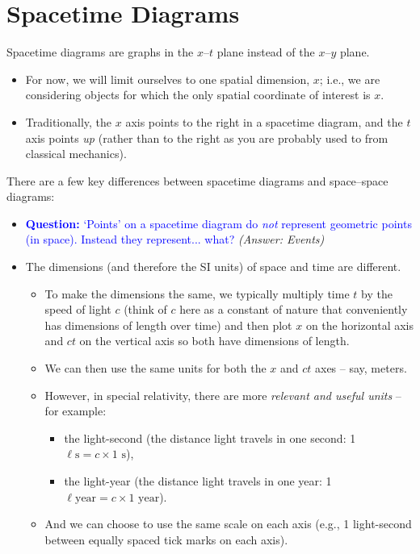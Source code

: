 \documentclass[11pt, letterpaper, openany]{book}
\begin{document}
\section{Spacetime Diagrams}

Spacetime diagrams are graphs in the $x$--$t$ plane instead of the $x$--$y$ plane.
\begin{itemize}
    \item For now, we will limit ourselves to one spatial dimension, $x$; i.e., we are considering objects for which the only spatial coordinate of interest is $x$.
    \item Traditionally, the $x$ axis points to the right in a spacetime diagram, and the $t$ axis points \textit{up} (rather than to the right as you are probably used to from classical mechanics).
\end{itemize}

\begin{center}
\end{center}

There are a few key differences between spacetime diagrams and space--space diagrams:

\begin{itemize}
    \item \textbf{\textcolor{blue}{Question:}} \textcolor{blue}{`Points' on a spacetime diagram do \textit{not} represent geometric points (in space). Instead they represent... what?} \textit{(Answer: Events)}
    \item The dimensions (and therefore the SI units) of space and time are different.
    \begin{itemize}
        \item To make the dimensions the same, we typically multiply time $t$ by the speed of light $c$ (think of $c$ here as a constant of nature that conveniently has dimensions of length over time) and then plot $x$ on the horizontal axis and $ct$ on the vertical axis so both have dimensions of length.
        \item We can then use the same units for both the $x$ and $ct$ axes -- say, meters.
        \item However, in special relativity, there are more \textit{relevant and useful units} -- for example:
        \begin{itemize}
            \item the light-second (the distance light travels in one second: 1 $\ell\text{s} = c \times 1\text{ s}$),
            \item the light-year (the distance light travels in one year: 1 $\ell\text{year} = c \times 1\text{ year}$).
        \end{itemize}
        \item And we can choose to use the same scale on each axis (e.g., 1 light-second between equally spaced tick marks on each axis).
    \end{itemize}
\end{itemize}
\end{document}
